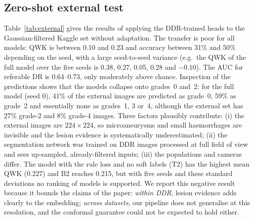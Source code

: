 \subsection{Zero-shot external test}
\label{sec:res-ext}
Table~\ref{tab:external} gives the results of applying the DDR-trained heads to the Gaussian-filtered Kaggle set without adaptation. The transfer is poor for all models: QWK is between 0.10 and 0.23 and accuracy between 31\% and 50\% depending on the seed, with a large seed-to-seed variance (e.g.\ the QWK of the full model over the five seeds is 0.38, 0.27, 0.05, 0.28 and $-0.10$). The AUC for referable DR is 0.64--0.73, only moderately above chance. Inspection of the predictions shows that the models collapse onto grades~0 and~2: for the full model (seed 0), 41\% of the external images are predicted as grade~0, 59\% as grade~2 and essentially none as grades~1, 3 or~4, although the external set has 27\% grade-2 and 8\% grade-4 images. Three factors plausibly contribute: (i) the external images are $224\times224$, so microaneurysms and small haemorrhages are invisible and the lesion evidence is systematically underestimated; (ii) the segmentation network was trained on DDR images processed at full field of view and sees up-sampled, already-filtered inputs; (iii) the populations and cameras differ. The model with the rule loss and no soft labels (T2) has the highest mean QWK (0.227) and B2 reaches 0.215, but with five seeds and these standard deviations no ranking of models is supported. We report this negative result because it bounds the claims of the paper: \emph{within DDR}, lesion evidence adds clearly to the embedding; \emph{across datasets}, our pipeline does not generalise at this resolution, and the conformal guarantee could not be expected to hold either.



